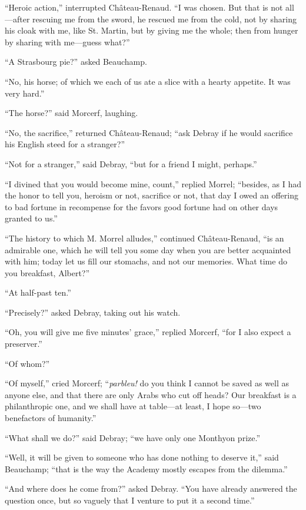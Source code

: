 “Heroic action,” interrupted Château-Renaud. “I was chosen. But that is
not all—after rescuing me from the sword, he rescued me from the cold,
not by sharing his cloak with me, like St. Martin, but by giving me the
whole; then from hunger by sharing with me—guess what?”

“A Strasbourg pie?” asked Beauchamp.

“No, his horse; of which we each of us ate a slice with a hearty
appetite. It was very hard.”

“The horse?” said Morcerf, laughing.

“No, the sacrifice,” returned Château-Renaud; “ask Debray if he would
sacrifice his English steed for a stranger?”

“Not for a stranger,” said Debray, “but for a friend I might, perhaps.”

“I divined that you would become mine, count,” replied Morrel;
“besides, as I had the honor to tell you, heroism or not, sacrifice or
not, that day I owed an offering to bad fortune in recompense for the
favors good fortune had on other days granted to us.”

“The history to which M. Morrel alludes,” continued Château-Renaud, “is
an admirable one, which he will tell you some day when you are better
acquainted with him; today let us fill our stomachs, and not our
memories. What time do you breakfast, Albert?”

“At half-past ten.”

“Precisely?” asked Debray, taking out his watch.

“Oh, you will give me five minutes’ grace,” replied Morcerf, “for I
also expect a preserver.”

“Of whom?”

“Of myself,” cried Morcerf; “\textit{parbleu!} do you think I cannot be saved
as well as anyone else, and that there are only Arabs who cut off
heads? Our breakfast is a philanthropic one, and we shall have at
table—at least, I hope so—two benefactors of humanity.”

“What shall we do?” said Debray; “we have only one Monthyon prize.”

“Well, it will be given to someone who has done nothing to deserve it,”
said Beauchamp; “that is the way the Academy mostly escapes from the
dilemma.”

“And where does he come from?” asked Debray. “You have already answered
the question once, but so vaguely that I venture to put it a second
time.”

